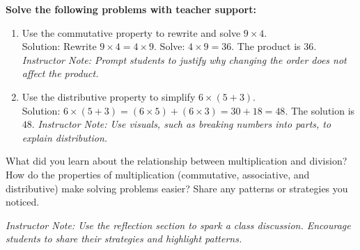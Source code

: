 \documentclass[12pt]{article}
\begin{document}

\vspace{3em}

\begin{tcolorbox}[colframe=black!60, colback=white, 
coltitle=black, colbacktitle=black!15, fonttitle=\bfseries\Large, 
title=Guided Practice, halign title=center, left=10pt, right=10pt, top=10pt, bottom=15pt]
\textbf{Solve the following problems with teacher support:}
\begin{enumerate}[itemsep=5em]
    \item Use the commutative property to rewrite and solve \(9 \times 4\).\\
    {\color{red}Solution: Rewrite \(9 \times 4 = 4 \times 9\). Solve: \(4 \times 9 = 36\). The product is \(36\).}
    {\color{blue} \textit{Instructor Note: Prompt students to justify why changing the order does not affect the product.}}
    \item Use the distributive property to simplify \(6 \times (5 + 3)\).\\
    {\color{red}Solution: \(6 \times (5 + 3) = (6 \times 5) + (6 \times 3) = 30 + 18 = 48\). The solution is \(48\).}
    {\color{blue} \textit{Instructor Note: Use visuals, such as breaking numbers into parts, to explain distribution.}}
\end{enumerate}
\end{tcolorbox}


\vspace{3em}

\begin{tcolorbox}[colframe=black!60, colback=white, 
coltitle=black, colbacktitle=black!15, fonttitle=\bfseries\Large, 
title=Reflection, halign title=center, left=10pt, right=10pt, top=10pt, bottom=80pt]
What did you learn about the relationship between multiplication and division? How do the properties of multiplication (commutative, associative, and distributive) make solving problems easier? Share any patterns or strategies you noticed.
\end{tcolorbox}

{\color{blue} \textit{Instructor Note: Use the reflection section to spark a class discussion. Encourage students to share their strategies and highlight patterns.}}
\end{document}
